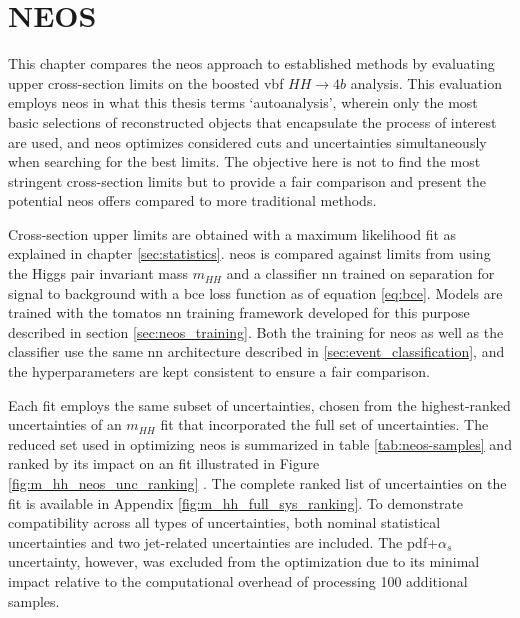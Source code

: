 \chapter{NEOS}











This chapter compares the \ac{neos} approach to established methods by evaluating upper cross-section limits on the boosted \ac{vbf} $HH\rightarrow4b$ analysis. This evaluation employs \ac{neos} in what this thesis terms `autoanalysis', wherein only the most basic selections of reconstructed objects that encapsulate the process of interest are used, and \ac{neos} optimizes considered cuts and uncertainties simultaneously when searching for the best limits. The objective here is not to find the most stringent cross-section limits but to provide a fair comparison and present the potential \ac{neos} offers compared to more traditional methods.

Cross-section upper limits are obtained with a maximum likelihood fit as explained in chapter \ref{sec:statistics}. \ac{neos} is compared against limits from using the Higgs pair invariant mass $m_{HH}$ and a classifier \ac{nn} trained on separation for signal to background with a \ac{bce} loss function as of equation \ref{eq:bce}. Models are trained with the \ac{tomatos} \ac{nn} training framework developed for this purpose \citep{tomatos} described in section \ref{sec:neos_training}. Both the training for \ac{neos} as well as the classifier use the same \ac{nn} architecture described in \ref{sec:event_classification}, and the hyperparameters are kept consistent to ensure a fair comparison.

Each fit employs the same subset of uncertainties, chosen from the highest-ranked uncertainties of an $m_{HH}$ fit that incorporated the full set of uncertainties. The reduced set used in optimizing \ac{neos} is summarized in table \ref{tab:neos-samples} and ranked by its impact on an \mhh fit illustrated in Figure \ref{fig:m_hh_neos_unc_ranking} . The complete ranked list of uncertainties on the \mhh fit is available in Appendix \ref{fig:m_hh_full_sys_ranking}. To demonstrate compatibility across all types of uncertainties, both nominal statistical uncertainties and two jet-related uncertainties are included. The \ac{pdf}+$\alpha_s$ uncertainty, however, was excluded from the optimization due to its minimal impact relative to the computational overhead of processing 100 additional samples.


